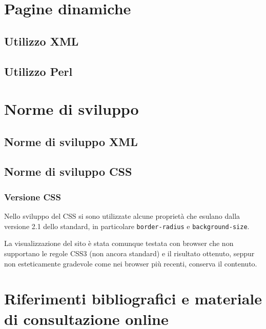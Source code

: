 \documentclass[10pt,a4paper,onecolumn]{article}
\begin{document}
\section{Pagine dinamiche}

\subsection{Utilizzo XML}

\subsection{Utilizzo Perl}

\clearpage

\section{Norme di sviluppo}

\subsection{Norme di sviluppo XML}

\subsection{Norme di sviluppo CSS}

\subsubsection{Versione CSS}
Nello sviluppo del CSS si sono utilizzate alcune proprietà che esulano dalla versione 2.1 dello standard, in particolare \verb+border-radius+ e \verb+background-size+.

La visualizzazione del sito è stata comunque testata con browser che non supportano le regole CSS3 (non ancora standard) e il risultato ottenuto, seppur non esteticamente gradevole come nei browser più recenti, conserva il contenuto.

\clearpage

\section{Riferimenti bibliografici e materiale di consultazione online}
\end{document}
